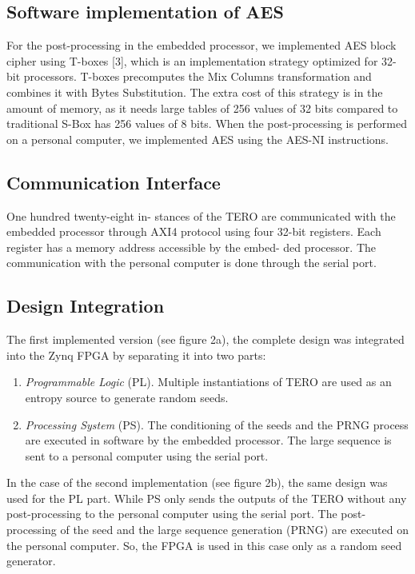 \documentclass[journal]{IEEEtran}
\begin{document}
\subsection{Software implementation of AES}

For the post-processing in the embedded processor, we implemented AES block cipher using T-boxes [3], which is an implementation strategy optimized for 32-bit processors. T-boxes precomputes the Mix Columns transformation and combines it with Bytes Substitution. The extra cost of this strategy is in the amount of memory, as it needs large tables of 256 values of 32 bits compared to traditional S-Box has 256 values of 8 bits. When the post-processing is performed on a personal computer, we implemented AES using the AES-NI instructions.

\subsection{Communication Interface}

One hundred twenty-eight in- stances of the TERO are communicated with the embedded processor through AXI4 protocol using four 32-bit registers. Each register has a memory address accessible by the embed- ded processor. The communication with the personal computer is done through the serial port.

\subsection{Design Integration}

The first implemented version (see figure 2a), the complete design was integrated into the Zynq FPGA by separating it into two parts:

\begin{enumerate}
    \item \textit{Programmable Logic} (PL). Multiple instantiations of TERO are used as an entropy source to generate random seeds.
    \item \textit{Processing System} (PS). The conditioning of the seeds and the PRNG process are executed in software by the embedded processor. The large sequence is sent to a personal computer using the serial port.
\end{enumerate}

In the case of the second implementation (see figure 2b), the same design was used for the PL part. While PS only sends the outputs of the TERO without any post-processing to the personal computer using the serial port. The post-processing of the seed and the large sequence generation (PRNG) are executed on the personal computer. So, the FPGA is used in this case only as a random seed generator.
\end{document}
